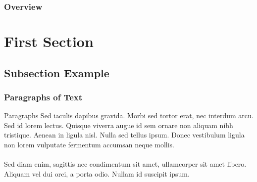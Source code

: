 \documentclass{beamer}
\begin{document}
{
\upbtitlebackground 
\begin{frame}
\titlepage %
\end{frame}
}

\begin{frame}
\frametitle{Overview} %
\tableofcontents %
\end{frame}


\section{First Section} %

\subsection{Subsection Example} %

\begin{frame}
\frametitle{Paragraphs of Text}

Paragraphs Sed iaculis dapibus gravida. Morbi sed tortor erat, nec interdum arcu. Sed id lorem lectus. Quisque viverra augue id sem ornare non aliquam nibh tristique. Aenean in ligula nisl. Nulla sed tellus ipsum. Donec vestibulum ligula non lorem vulputate fermentum accumsan neque mollis.\\~\\

Sed diam enim, sagittis nec condimentum sit amet, ullamcorper sit amet libero. Aliquam vel dui orci, a porta odio. Nullam id suscipit ipsum. 
\end{frame}
\end{document}
